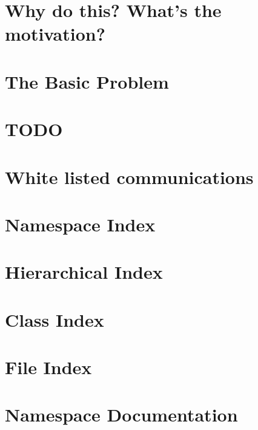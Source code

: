 \documentclass[twoside]{book}
\begin{document}
\chapter{Why do this? What's the motivation?}
\label{md_motivation}
\hypertarget{md_motivation}{}

\chapter{The Basic Problem}
\label{md_the_basic_problem}
\hypertarget{md_the_basic_problem}{}

\chapter{T\-O\-D\-O}
\label{md_todo}
\hypertarget{md_todo}{}

\chapter{White listed communications}
\label{md_white_listed_communications}
\hypertarget{md_white_listed_communications}{}

\chapter{Namespace Index}

\chapter{Hierarchical Index}

\chapter{Class Index}

\chapter{File Index}

\chapter{Namespace Documentation}



\end{document}
